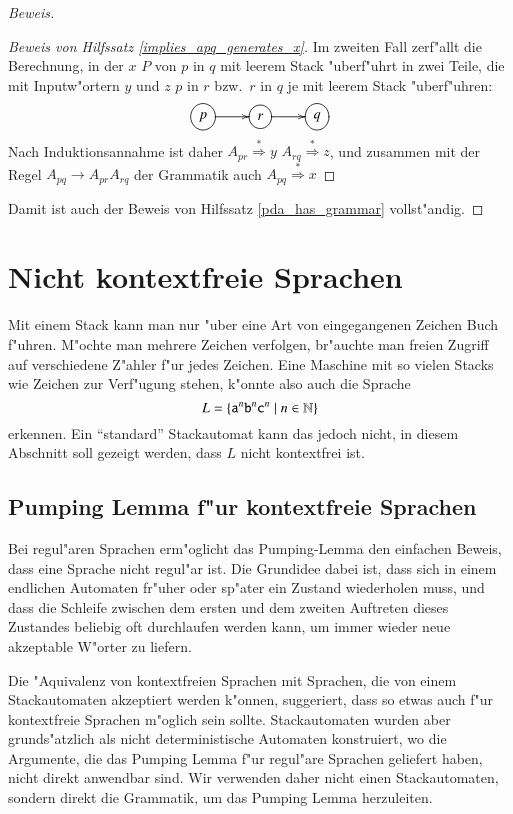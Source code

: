 \begin{proof}[Beweis]
\begin{proof}[Beweis von Hilfssatz \ref{implies_apq_generates_x}]
Im zweiten Fall zerf"allt die Berechnung, in der $x$ $P$ von $p$ in
$q$  mit leerem Stack "uberf"uhrt in zwei Teile, die mit Inputw"ortern
$y$ und $z$ $p$ in $r$ bzw.~$r$ in $q$ je mit leerem Stack "uberf"uhren:
\[
\entrymodifiers={++[o][F]}
\xymatrix{
p\ar[r]
	&r\ar[r]
		&q
}
\]
Nach Induktionsannahme ist daher
$A_{pr}\overset{*}{\Rightarrow}y$
$A_{rq}\overset{*}{\Rightarrow}z$, und zusammen mit der Regel
$A_{pq}\to A_{pr}A_{rq}$ der Grammatik auch
$A_{pq}\overset{*}{\Rightarrow} x$
\end{proof}

Damit ist auch der Beweis von Hilfssatz \ref{pda_has_grammar} vollst"andig.
\end{proof}

\section{Nicht kontextfreie Sprachen}
Mit einem Stack kann man nur "uber eine Art von eingegangenen
Zeichen Buch f"uhren. M"ochte man mehrere Zeichen verfolgen,
br"auchte man freien Zugriff auf verschiedene Z"ahler f"ur jedes
Zeichen. Eine Maschine mit so vielen Stacks wie Zeichen zur Verf"ugung
stehen, k"onnte also auch die Sprache
\[
L=\{ {\tt a}^n {\tt b}^n {\tt c}^n\;|\;n\in\mathbb N\}
\]
erkennen. Ein ``standard'' Stackautomat kann das jedoch nicht,
in diesem Abschnitt soll gezeigt werden, dass $L$ nicht kontextfrei
ist. 

\subsection{Pumping Lemma f"ur kontextfreie Sprachen}
Bei regul"aren Sprachen erm"oglicht das Pumping-Lemma den einfachen
Beweis, dass eine Sprache nicht regul"ar ist. Die Grundidee dabei ist,
dass sich in einem endlichen Automaten fr"uher oder sp"ater ein
Zustand wiederholen muss, und dass die Schleife zwischen dem ersten
und dem zweiten Auftreten dieses Zustandes beliebig oft durchlaufen
werden kann, um immer wieder neue akzeptable W"orter zu liefern.

Die "Aquivalenz von kontextfreien Sprachen mit Sprachen, die von einem
Stackautomaten akzeptiert werden k"onnen, suggeriert, dass so etwas
auch f"ur kontextfreie Sprachen m"oglich sein sollte. Stackautomaten
wurden aber grunds"atzlich als nicht deterministische Automaten
konstruiert, wo die Argumente, die das Pumping Lemma f"ur regul"are
Sprachen geliefert haben, nicht direkt anwendbar sind. Wir verwenden
daher nicht einen Stackautomaten, sondern direkt die Grammatik, um
das Pumping Lemma herzuleiten.

